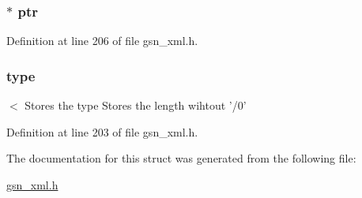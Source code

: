 \hypertarget{a00436_aff356b2f59162d31b4f15f29467076a0}{
\subsubsection[{ptr}]{$\ast$ {\bf ptr}}}
\label{a00436_aff356b2f59162d31b4f15f29467076a0}


Definition at line 206 of file gsn\_\-xml.h.

\hypertarget{a00436_a631bceb766461ab7475c7ed56717aac8}{
\subsubsection[{type}]{ {\bf type}}}
\label{a00436_a631bceb766461ab7475c7ed56717aac8}
$<$ Stores the type Stores the length wihtout '/0' 

Definition at line 203 of file gsn\_\-xml.h.



The documentation for this struct was generated from the following file:\begin{DoxyCompactItemize}
\item 
\hyperlink{a00616}{gsn\_\-xml.h}\end{DoxyCompactItemize}
